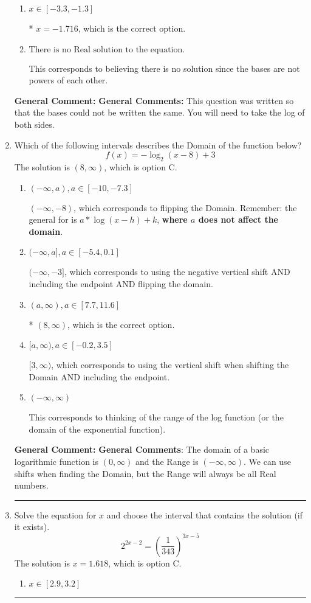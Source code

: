 \documentclass{extbook}[14pt]
\newcommand{\litem}[1]{\item #1

\rule{\textwidth}{0.4pt}}
\begin{document}
\begin{enumerate}
{\begin{enumerate}[label=\Alph*.]
$x = -0.102$, which corresponds to distributing the $\ln(base)$ to the first term of the exponent only.
\item \( x \in [-3.3, -1.3] \)

* $x = -1.716$, which is the correct option.
\item \( \text{There is no Real solution to the equation.} \)

This corresponds to believing there is no solution since the bases are not powers of each other.
\end{enumerate}

\textbf{General Comment:} \textbf{General Comments:} This question was written so that the bases could not be written the same. You will need to take the log of both sides.
}
\litem{
Which of the following intervals describes the Domain of the function below?
\[ f(x) = -\log_2{(x-8)}+3 \]The solution is \( (8, \infty) \), which is option C.\begin{enumerate}[label=\Alph*.]
\item \( (-\infty, a), a \in [-10, -7.3] \)

$(-\infty, -8)$, which corresponds to flipping the Domain. Remember: the general for is $a*\log(x-h)+k$, \textbf{where $a$ does not affect the domain}.
\item \( (-\infty, a], a \in [-5.4, 0.1] \)

$(-\infty, -3]$, which corresponds to using the negative vertical shift AND including the endpoint AND flipping the domain.
\item \( (a, \infty), a \in [7.7, 11.6] \)

* $(8, \infty)$, which is the correct option.
\item \( [a, \infty), a \in [-0.2, 3.5] \)

$[3, \infty)$, which corresponds to using the vertical shift when shifting the Domain AND including the endpoint.
\item \( (-\infty, \infty) \)

This corresponds to thinking of the range of the log function (or the domain of the exponential function).
\end{enumerate}

\textbf{General Comment:} \textbf{General Comments}: The domain of a basic logarithmic function is $(0, \infty)$ and the Range is $(-\infty, \infty)$. We can use shifts when finding the Domain, but the Range will always be all Real numbers.
}
\litem{
Solve the equation for $x$ and choose the interval that contains the solution (if it exists).
\[ 2^{2x-2} = \left(\frac{1}{343}\right)^{3x-5} \]The solution is \( x = 1.618 \), which is option C.\begin{enumerate}[label=\Alph*.]
\item \( x \in [2.9, 3.2] \)


\end{enumerate}}
\end{enumerate}
\end{document}
